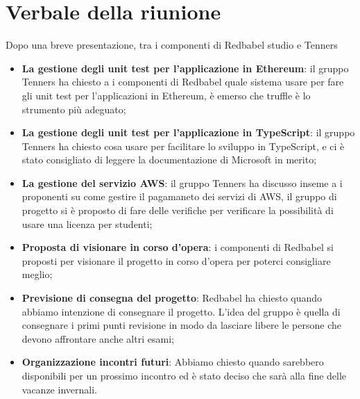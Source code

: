 \section{Verbale della riunione}
		Dopo una breve presentazione, tra i componenti di Redbabel studio e Tenners
	\begin{itemize}
		\item \textbf {La gestione degli unit test per l'applicazione in Ethereum}:
		il gruppo Tenners ha chiesto a i componenti di Redbabel quale sistema usare
		per fare gli unit test per l'applicazioni in Ethereum, è emerso che truffle
		è lo strumento più adeguato;
		\item \textbf {La gestione degli unit test per l'applicazione in TypeScript}:
		il gruppo Tenners ha chiesto cosa usare per facilitare lo sviluppo in TypeScript,
		e ci è stato consigliato di leggere la documentazione di Microsoft in merito;
		\item \textbf {La gestione del servizio AWS}: il gruppo Tenners ha  discusso
		inseme a i proponenti su come gestire il pagamaneto dei servizi di AWS,
		il gruppo di progetto si è proposto di fare delle verifiche per verificare la
		 possibilità di usare una licenza per studenti;
		\item \textbf {Proposta di visionare in corso d'opera}: i componenti di Redbabel
		si proposti per visionare il progetto in corso d'opera per poterci consigliare meglio;
		\item \textbf {Previsione di consegna del progetto}: Redbabel ha chiesto
		quando abbiamo intenzione di consegnare il progetto. L'idea del gruppo è
		quella di consegnare i primi punti revisione in modo da lasciare libere le
		persone che devono affrontare anche altri esami;
		\item \textbf {Organizzazione incontri futuri}: Abbiamo chiesto quando
		sarebbero disponibili per un prossimo incontro ed è stato deciso che sarà
		alla fine delle vacanze invernali.
	\end{itemize}
